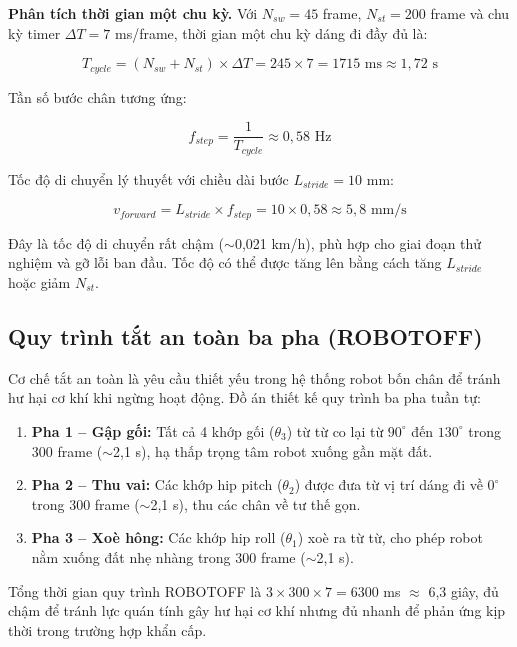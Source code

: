 \textbf{Phân tích thời gian một chu kỳ.} Với $N_{sw} = 45$ frame, $N_{st} = 200$ frame và chu kỳ timer $\Delta T = 7$ ms/frame, thời gian một chu kỳ dáng đi đầy đủ là:

\begin{equation}
    T_{cycle} = (N_{sw} + N_{st}) \times \Delta T = 245 \times 7 = 1715 \text{ ms} \approx 1{,}72 \text{ s}
\end{equation}

Tần số bước chân tương ứng:

\begin{equation}
    f_{step} = \frac{1}{T_{cycle}} \approx 0{,}58 \text{ Hz}
\end{equation}

Tốc độ di chuyển lý thuyết với chiều dài bước $L_{stride} = 10$ mm:

\begin{equation}
    v_{forward} = L_{stride} \times f_{step} = 10 \times 0{,}58 \approx 5{,}8 \text{ mm/s}
\end{equation}

Đây là tốc độ di chuyển rất chậm ($\sim$0,021 km/h), phù hợp cho giai đoạn thử nghiệm và gỡ lỗi ban đầu. Tốc độ có thể được tăng lên bằng cách tăng $L_{stride}$ hoặc giảm $N_{st}$.

\subsection{Quy trình tắt an toàn ba pha (ROBOTOFF)}

Cơ chế tắt an toàn là yêu cầu thiết yếu trong hệ thống robot bốn chân để tránh hư hại cơ khí khi ngừng hoạt động. Đồ án thiết kế quy trình ba pha tuần tự:

\begin{enumerate}
    \item \textbf{Pha 1 -- Gập gối:} Tất cả 4 khớp gối ($\theta_3$) từ từ co lại từ $90^\circ$ đến $130^\circ$ trong 300 frame ($\sim$2,1 s), hạ thấp trọng tâm robot xuống gần mặt đất.
    \item \textbf{Pha 2 -- Thu vai:} Các khớp hip pitch ($\theta_2$) được đưa từ vị trí dáng đi về $0^\circ$ trong 300 frame ($\sim$2,1 s), thu các chân về tư thế gọn.
    \item \textbf{Pha 3 -- Xoè hông:} Các khớp hip roll ($\theta_1$) xoè ra từ từ, cho phép robot nằm xuống đất nhẹ nhàng trong 300 frame ($\sim$2,1 s).
\end{enumerate}

Tổng thời gian quy trình ROBOTOFF là $3 \times 300 \times 7 = 6300$ ms $\approx$ 6,3 giây, đủ chậm để tránh lực quán tính gây hư hại cơ khí nhưng đủ nhanh để phản ứng kịp thời trong trường hợp khẩn cấp.

